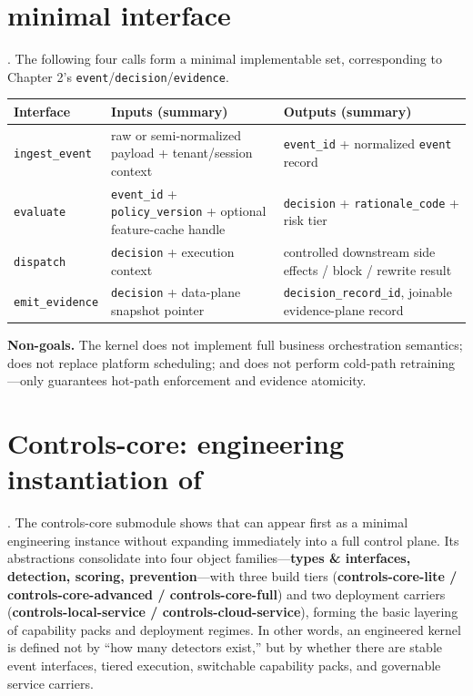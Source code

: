 \documentclass[11pt,a4paper]{report}
\begin{document}
\section{\SafetyKernel{} minimal interface}
\DecoupledSafety{}. The following four calls form a minimal implementable set, corresponding to Chapter 2’s \texttt{event}/\texttt{decision}/\texttt{evidence}.

\begin{center}
\footnotesize
\begin{tabular}{@{}p{}p{}p{}@{}}
\toprule
\textbf{Interface} & \textbf{Inputs (summary)} & \textbf{Outputs (summary)} \\
\midrule
\texttt{ingest\_event} & raw or semi-normalized payload + tenant/session context & \texttt{event\_id} + normalized \texttt{event} record \\
\texttt{evaluate} & \texttt{event\_id} + \texttt{policy\_version} + optional feature-cache handle & \texttt{decision} + \texttt{rationale\_code} + risk tier \\
\texttt{dispatch} & \texttt{decision} + execution context & controlled downstream side effects / block / rewrite result \\
\texttt{emit\_evidence} & \texttt{decision} + data-plane snapshot pointer & \texttt{decision\_record\_id}, joinable evidence-plane record \\
\bottomrule
\end{tabular}
\end{center}

\noindent\textbf{Non-goals.} The kernel does not implement full business orchestration semantics; does not replace platform scheduling; and does not perform cold-path retraining—only guarantees hot-path enforcement and evidence atomicity.

\section{Controls-core: engineering instantiation of \SafetyKernel{}}
\DecoupledSafety{}. The controls-core submodule shows that \SafetyKernel{} can appear first as a minimal engineering instance without expanding immediately into a full control plane. Its abstractions consolidate into four object families—\textbf{types \& interfaces, detection, scoring, prevention}—with three build tiers (\textbf{controls-core-lite / controls-core-advanced / controls-core-full}) and two deployment carriers (\textbf{controls-local-service / controls-cloud-service}), forming the basic layering of capability packs and deployment regimes. In other words, an engineered kernel is defined not by “how many detectors exist,” but by whether there are stable event interfaces, tiered execution, switchable capability packs, and governable service carriers.
\end{document}
